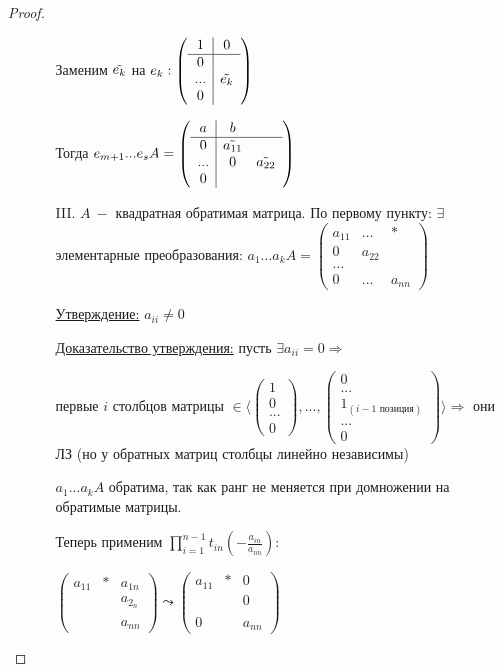 \begin{proof}
\begin{enumerate}
\begin{enumerate}
        Заменим $\Tilde{e_k}$ на $e_k:\left(\begin{array}{c|c}1 & 0 \\ 
\hline 0  \\ ... & \Tilde{e_k} \\ 0 \end{array}\right)$

        Тогда $e_{m+1}...e_sA=\left(\begin{array}{c|c c}a & b\\ \hline 0 & 
\Tilde{a_{11}} \\ ... & 0 & \Tilde{a_{22}} \\ 0 \end{array}\right)$
        \item[III.] $A\ -$ квадратная обратимая матрица. По первому 
пункту: $\exists$ элементарные преобразования: $a_1...a_kA=\begin{pmatrix}
            a_{11} & ... & * \\ 0 & a_{22} \\ ... \\ 0 & ... & a_{nn}
        \end{pmatrix}$

        \underline{Утверждение:} $a_{ii}\neq 0$

        \underline{Доказательство утверждения:} пусть $\exists 
a_{ii}=0\Rightarrow $ 
        
        первые $i$ столбцов матрицы $\in \bigg\langle\begin{pmatrix}
            1 \\ 0 \\ ... \\ 0
        \end{pmatrix}, ..., \begin{pmatrix}
            0 \\ ... \\ 1_{(i-1\text{ позиция})} \\... \\ 0
        \end{pmatrix}\bigg\rangle \Rightarrow$ они ЛЗ (но у обратных 
матриц столбцы линейно независимы)

        $a_1...a_kA$ обратима, так как ранг не меняется при домножении на 
обратимые матрицы.

        Теперь применим 
$\prod\limits_{i=1}^{n-1}t_{in}(-\frac{a_{in}}{a_{nn}})$:

        $\begin{pmatrix}
            a_{11} & * & a_{1n} \\ & & a_{2_n} \\ \\ & & a_{nn}
        \end{pmatrix}\leadsto \begin{pmatrix}
            a_{11} & * & 0 \\ & & 0 \\ \\ 0 & & a_{nn}
        \end{pmatrix}$


\end{enumerate}
\end{enumerate}
\end{proof}
